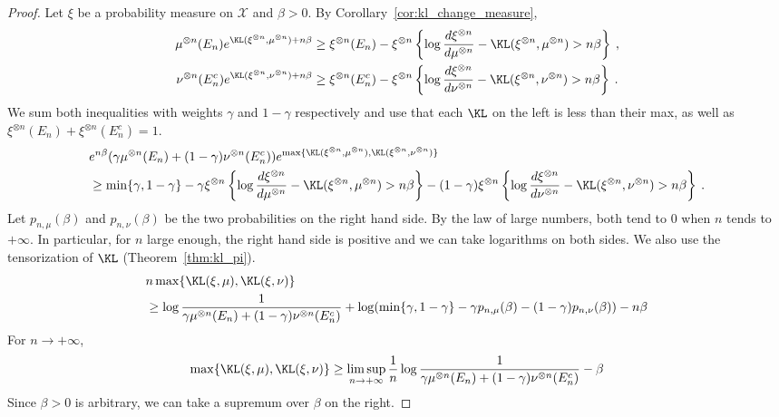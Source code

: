 \begin{proof}
Let $\xi$ be a probability measure on $\mathcal X$ and $\beta > 0$. By Corollary~\ref{cor:kl_change_measure},
\begin{align*}
\mu^{\otimes n}(E_n) e^{\KL(\xi^{\otimes n}, \mu^{\otimes n}) + n\beta}
&\ge \xi^{\otimes n}(E_n) - \xi^{\otimes n}\left\{ \log\frac{d \xi^{\otimes n}}{d \mu^{\otimes n}} - \KL(\xi^{\otimes n}, \mu^{\otimes n}) > n\beta \right\}
\: , \\
\nu^{\otimes n}(E_n^c) e^{\KL(\xi^{\otimes n}, \nu^{\otimes n}) + n\beta}
&\ge \xi^{\otimes n}(E_n^c) - \xi^{\otimes n}\left\{ \log\frac{d \xi^{\otimes n}}{d \nu^{\otimes n}} - \KL(\xi^{\otimes n}, \nu^{\otimes n}) > n\beta \right\}
\: .
\end{align*}
We sum both inequalities with weights $\gamma$ and $1-\gamma$ respectively and use that each $\KL$ on the left is less than their max, as well as $\xi^{\otimes n}(E_n) + \xi^{\otimes n}(E_n^c) = 1$.
\begin{align*}
&e^{n\beta} (\gamma\mu^{\otimes n}(E_n) + (1-\gamma)\nu^{\otimes n}(E_n^c)) e^{\max\{\KL(\xi^{\otimes n}, \mu^{\otimes n}), \KL(\xi^{\otimes n}, \nu^{\otimes n})\}}
\\
&\ge \min\{\gamma, 1-\gamma\} - \gamma\xi^{\otimes n}\left\{ \log\frac{d \xi^{\otimes n}}{d \mu^{\otimes n}} - \KL(\xi^{\otimes n}, \mu^{\otimes n}) > n\beta \right\}
  - (1 - \gamma)\xi^{\otimes n}\left\{ \log\frac{d \xi^{\otimes n}}{d \nu^{\otimes n}} - \KL(\xi^{\otimes n}, \nu^{\otimes n}) > n\beta \right\}
\: .
\end{align*}
Let $p_{n,\mu}(\beta)$ and $p_{n, \nu}(\beta)$ be the two probabilities on the right hand side. By the law of large numbers, both tend to 0 when $n$ tends to $+\infty$.
In particular, for $n$ large enough, the right hand side is positive and we can take logarithms on both sides. We also use the tensorization of $\KL$ (Theorem~\ref{thm:kl_pi}).
\begin{align*}
& n \max\{\KL(\xi, \mu), \KL(\xi, \nu)\}
\\
&\ge \log \frac{1}{\gamma \mu^{\otimes n}(E_n) + (1 - \gamma)\nu^{\otimes n}(E_n^c)} + \log (\min\{\gamma, 1-\gamma\} - \gamma p_{n, \mu}(\beta) - (1 - \gamma) p_{n, \nu}(\beta)) - n\beta
\end{align*}
For $n \to +\infty$,
\begin{align*}
\max\{\KL(\xi, \mu), \KL(\xi, \nu)\}
\ge \limsup_{n \to + \infty}\frac{1}{n}\log \frac{1}{\gamma \mu^{\otimes n}(E_n) + (1 - \gamma)\nu^{\otimes n}(E_n^c)} - \beta
\end{align*}
Since $\beta > 0$ is arbitrary, we can take a supremum over $\beta$ on the right.
\end{proof}


